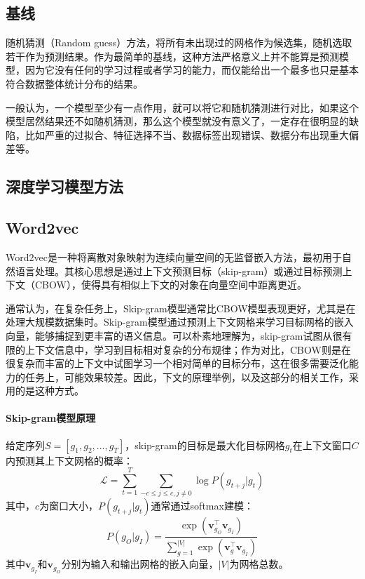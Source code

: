 \documentclass{article}
\begin{document}
\subsection{基线}

随机猜测（Random guess）方法，将所有未出现过的网格作为候选集，随机选取若干作为预测结果\cite{Dietterich1998Approximate}。作为最简单的基线，这种方法严格意义上并不能算是预测模型，因为它没有任何的学习过程或者学习的能力，而仅能给出一个最多也只是基本符合数据整体统计分布的结果。

一般认为，一个模型至少有一点作用，就可以将它和随机猜测进行对比，如果这个模型居然结果还不如随机猜测，那么这个模型就没有意义了，一定存在很明显的缺陷，比如严重的过拟合、特征选择不当、数据标签出现错误、数据分布出现重大偏差等\cite{Domingos2012MLthingstoknow}。

\subsection{深度学习模型方法}
\subsection{Word2vec}

Word2vec是一种将离散对象映射为连续向量空间的无监督嵌入方法，最初用于自然语言处理。其核心思想是通过上下文预测目标（skip-gram）或通过目标预测上下文（CBOW），使得具有相似上下文的对象在向量空间中距离更近\cite{word2vec}。

通常认为，在复杂任务上，Skip-gram模型通常比CBOW模型表现更好，尤其是在处理大规模数据集时。Skip-gram模型通过预测上下文网格来学习目标网格的嵌入向量，能够捕捉到更丰富的语义信息。可以朴素地理解为，skip-gram试图从很有限的上下文信息中，学习到目标相对复杂的分布规律；作为对比，CBOW则是在很复杂而丰富的上下文中试图学习一个相对简单的目标分布，这在很多需要泛化能力的任务上，可能效果较差\cite{menon_empirical_2020}。因此，下文的原理举例，以及这部分的相关工作，采用的是这种方式。

\paragraph{Skip-gram模型原理}
给定序列$S = [g_1, g_2, ..., g_T]$，skip-gram的目标是最大化目标网格$g_t$在上下文窗口$C$内预测其上下文网格的概率：
\begin{equation}
\mathcal{L} = \sum_{t=1}^{T} \sum_{-c \leq j \leq c, j \neq 0} \log P(g_{t+j} | g_t)
\end{equation}
其中，$c$为窗口大小，$P(g_{t+j} | g_t)$通常通过softmax建模：
\begin{equation}
P(g_O | g_I) = \frac{\exp(\mathbf{v}_{g_O}^\top \mathbf{v}_{g_I})}{\sum_{g=1}^{|V|} \exp(\mathbf{v}_g^\top \mathbf{v}_{g_I})}
\end{equation}
其中$\mathbf{v}_{g_I}$和$\mathbf{v}_{g_O}$分别为输入和输出网格的嵌入向量，$|V|$为网格总数。
\end{document}
